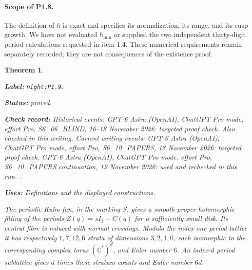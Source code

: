 \documentclass[11pt,a4paper]{article}
\newtheorem{theorem}{Theorem}[section]
\theoremstyle{definition}
\newcommand{\StatementRecord}[4]{\par\smallskip\begingroup\upshape\raggedright\noindent\textbf{Label:} \nolinkurl{#1}.\par\noindent\textbf{Status:} #2.\par\noindent\textbf{Check record:} #3.\par\noindent\textbf{Uses:} #4.\par\endgroup\smallskip}
\begin{document}
\paragraph{Scope of P1.8.}
The definition of $h$ is exact and specifies its normalization, its
range, and its cusp growth.  We have not evaluated $h_{\min}$ or
supplied the two independent thirty-digit period calculations requested
in item 1.4.  These numerical requirements remain separately recorded;
they are not consequences of the existence proof.

\begin{theorem}\label{night:P1.9}
\StatementRecord{night:P1.9}{proved}{Historical events: GPT-6 Astra (OpenAI), ChatGPT Pro mode, effort Pro, S6\_06\_BLIND, 16--18 November 2026: targeted proof check. Also checked in this writing. Current writing events: GPT-6 Astra (OpenAI), ChatGPT Pro mode, effort Pro, S6\_10\_PAPERS, 18 November 2026: targeted proof check. GPT-6 Astra (OpenAI), ChatGPT Pro mode, effort Pro, S6\_10\_PAPERS continuation, 19 November 2026: used and rechecked in this run. }{Definitions and the displayed constructions}
The periodic Kuhn fan, in the marking $S$, gives a smooth proper
holomorphic filling of the periods $Z(q)=sI_3+C(q)$ for a sufficiently
small disk.  Its central fibre is reduced with normal crossings.
Modulo the index-one period lattice it has respectively $1,7,12,6$
strata of dimensions $3,2,1,0$, each isomorphic to the corresponding
complex torus $(\mathbb C^*)^d$, and Euler number $6$.
An index-$d$ period sublattice gives $d$ times these stratum counts and
Euler number $6d$.
\end{theorem}
\end{document}
